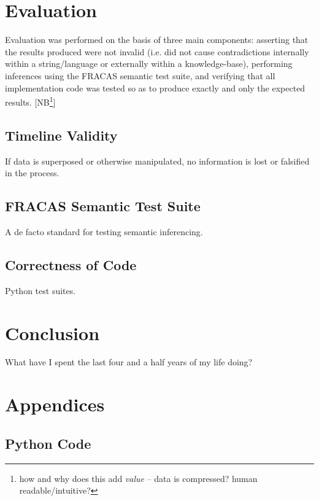 \documentclass[a4paper,12pt,leqno]{article}
\newcommand{\selfnote}[1]{{\color{red}[NB\footnote{{\color{red}#1}}]}}
\newcommand{\nb}{\selfnote}
\begin{document}
\newpage
\section{Evaluation}\label{sec:evaluation}
Evaluation was performed on the basis of three main components: asserting that the results produced were not invalid (i.e. did not cause contradictions internally within a string/language or externally within a knowledge-base), performing inferences using the FRACAS semantic test suite, and verifying that all implementation code was tested so as to produce exactly and only the expected results. \nb{how and why does this add \textit{value} -- data is compressed? human readable/intuitive?}
\subsection{Timeline Validity}\label{sub:validity}
If data is superposed or otherwise manipulated, no information is lost or falsified in the process.
\subsection{FRACAS Semantic Test Suite}\label{sub:fracas}
A de facto standard for testing semantic inferencing.
\subsection{Correctness of Code}\label{sub:correct}
Python test suites.
\newpage
\section{Conclusion}\label{sec:conclusion}
What have I spent the last four and a half years of my life doing?

\newpage
\pagestyle{empty}
\onehalfspacing


\newpage
\section*{Appendices}
\subsection*{Python Code}
\end{document}
